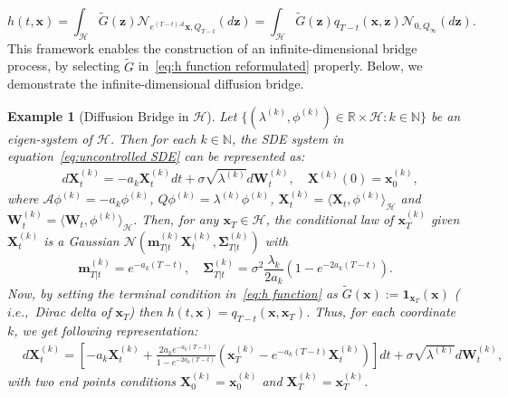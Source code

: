\documentclass[nohyperref]{article}
\theoremstyle{plain}
\newtheorem{example}[theorem]{Example}
\theoremstyle{remark}
\newcommand{\la}{\langle}
\newcommand{\ra}{\rangle}
\newcommand{\mc}{\mathcal}
\newcommand{\mb}{\mathbf}
\newcommand{\ie}{\textit{i}.\textit{e}., }
\begin{document}
\begin{equation}\label{eq:h function reformulated}
    h(t, \mathbf{x}) = \int_{\mathcal{H}} \tilde{G}(\mathbf{z}) \mathcal{N}_{e^{(T-t)\mathcal{A}}\mathbf{x}, Q_{T-t}}(d\mathbf{z}) = \int_{\mathcal{H}} \tilde{G}(\mathbf{z}) q_{T-t}(\mathbf{x}, \mathbf{z}) \mathcal{N}_{0, Q_{\infty}}(d\mathbf{z}).
\end{equation}
This framework enables the construction of an infinite-dimensional bridge process, by selecting $\tilde{G}$ in~\eqref{eq:h function reformulated} properly. Below, we demonstrate the infinite-dimensional diffusion bridge.
\begin{example}[Diffusion Bridge in $\mc{H}$]\label{example:diffusion bridge} Let $\{(\lambda^{(k)}, \phi^{(k)}) \in \mathbb{R} \times \mc{H} : k \in \mathbb{N}\}$ be an eigen-system of $\mc{H}$. Then for each $k \in \mathbb{N}$, the SDE system in equation~\eqref{eq:uncontrolled SDE} can be represented as:
\begin{align}
    & d\mb{X}^{(k)}_t = -a_k\mb{X}^{(k)}_t dt + \sigma \sqrt{\lambda^{(k)}}d\mb{W}^{(k)}_t, \quad \mb{X}^{(k)}(0) = \mb{x}^{(k)}_0,
\end{align}
where $\mc{A}\phi^{(k)} = -a_k \phi^{(k)}$, $Q \phi^{(k)} = \lambda^{(k)}\phi^{(k)}$, $\mb{X}^{(k)}_t = \la \mb{X}_t, \phi^{(k)}\ra_{\mc{H}}$ and $\mb{W}^{(k)}_t = \la \mb{W}_t, \phi^{(k)}\ra_{\mc{H}}$. Then, for any $\mb{x}_T \in \mc{H}$, the conditional law of $\mb{x}^{(k)}_T$ given $\mb{X}^{(k)}_t$ is a Gaussian  $\mc{N}(\mb{m}^{(k)}_{T|t}\mb{X}_t^{(k)}, \mb{\Sigma}^{(k)}_{T|t})$ with
\begin{equation}
    \mb{m}^{(k)}_{T|t} = e^{-a_k (T-t)}, \quad \mb{\Sigma}^{(k)}_{T|t} = \sigma^2 \frac{\lambda_k}{2a_k}\left(1 - e^{-2a_k(T-t)}\right).
\end{equation}
Now, by setting the terminal condition in~\eqref{eq:h function} as $\tilde{G}(\mb{x}) := \mb{1}_{\mb{x}_T}(\mb{x})$ ($\ie$ Dirac delta of $\mb{x}_T$) then $h(t, \mb{x}) = q_{T-t}(\mb{x}, \mb{x}_T)$. Thus, for each coordinate $k$, we get following representation: 
\begin{align}\label{eq:diffusion bridge process}
    & d\mb{X}^{(k)}_t = \left[-a_k\mb{X}^{(k)}_t + \frac{2a_k e^{-a_k(T-t)}}{1 - e^{-2a_k(T-t)}}(\mb{x}^{(k)}_T - e^{-a_k (T-t)}\mb{X}_t^{(k)})\right]dt + \sigma \sqrt{\lambda^{(k)}}d\mb{W}^{(k)}_t,
\end{align}
with two end points conditions $\mb{X}^{(k)}_0 = \mb{x}^{(k)}_0$ and $\mb{X}^{(k)}_T = \mb{x}^{(k)}_T$.
\end{example}
\end{document}
